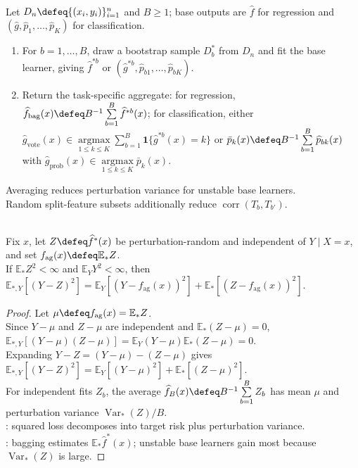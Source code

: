 \begin{method} \label{meth:sl-bagging-prediction-aggregation} \\
Let $D_n\defeq\{(x_i,y_i)\}_{i=1}^n$ and $B\geq1$; base outputs are $\widehat{f}$ for regression and $(\widehat{g},\widehat{p}_1,\ldots,\widehat{p}_K)$ for classification.
\begin{enumerate}[label=(\roman*)]
\setlength{\itemsep}{0pt}
\item For $b=1,\ldots,B$, draw a bootstrap sample $D_b^*$ from $D_n$ and fit the base learner, giving $\widehat{f}^{*b}$ or $(\widehat{g}^{*b},\widehat{p}_{b1},\ldots,\widehat{p}_{bK})$.
\item Return the task-specific aggregate: for regression, $\widehat{f}_{\mathrm{bag}}(x)\defeq B^{-1}\sum\limits_{b=1}^B\widehat{f}^{*b}(x)$; for classification, either $\widehat{g}_{\mathrm{vote}}(x)\in\operatorname*{argmax}\limits_{1\leq k\leq K}\sum\limits_{b=1}^B\mathbf{1}\{\widehat{g}^{*b}(x)=k\}$ or $\bar{p}_k(x)\defeq B^{-1}\sum\limits_{b=1}^B\widehat{p}_{bk}(x)$ with $\widehat{g}_{\mathrm{prob}}(x)\in\operatorname*{argmax}\limits_{1\leq k\leq K}\bar{p}_k(x)$.
\end{enumerate}
Averaging reduces perturbation variance for unstable base learners.\\
Random split-feature subsets additionally reduce $\operatorname{corr}(T_b,T_{b'})$.
\end{method}

\begin{theorem} \label{thm:sl-bagging-squared-error-aggregation} \\
Fix $x$, let $Z\defeq\widehat{f}^{\ast}(x)$ be perturbation-random and independent of $Y\mid X=x$, and set $f_{\mathrm{ag}}(x)\defeq\mathbb{E}_{\ast}Z$.\\
If $\mathbb{E}_{\ast}Z^2<\infty$ and $\mathbb{E}_Y Y^2<\infty$, then $\mathbb{E}_{\ast,Y}[(Y-Z)^2]=\mathbb{E}_Y[(Y-f_{\mathrm{ag}}(x))^2]+\mathbb{E}_{\ast}[(Z-f_{\mathrm{ag}}(x))^2]$.
\begin{proof} Let $\mu\defeq f_{\mathrm{ag}}(x)=\mathbb{E}_{\ast}Z$.\\
Since $Y-\mu$ and $Z-\mu$ are independent and $\mathbb{E}_{\ast}(Z-\mu)=0$, $\mathbb{E}_{\ast,Y}[(Y-\mu)(Z-\mu)]=\mathbb{E}_Y(Y-\mu)\mathbb{E}_{\ast}(Z-\mu)=0$.\\
Expanding $Y-Z=(Y-\mu)-(Z-\mu)$ gives $\mathbb{E}_{\ast,Y}[(Y-Z)^2]=\mathbb{E}_Y[(Y-\mu)^2]+\mathbb{E}_{\ast}[(Z-\mu)^2]$.\\
For independent fits $Z_b$, the average $\widehat{f}_B(x)\defeq B^{-1}\sum\limits_{b=1}^B Z_b$ has mean $\mu$ and perturbation variance $\operatorname{Var}_{\ast}(Z)/B$.\\
: squared loss decomposes into target risk plus perturbation variance.\\
: bagging estimates $\mathbb{E}_{\ast}\widehat{f}^{\ast}(x)$; unstable base learners gain most because $\operatorname{Var}_{\ast}(Z)$ is large.
\end{proof}
\end{theorem}


